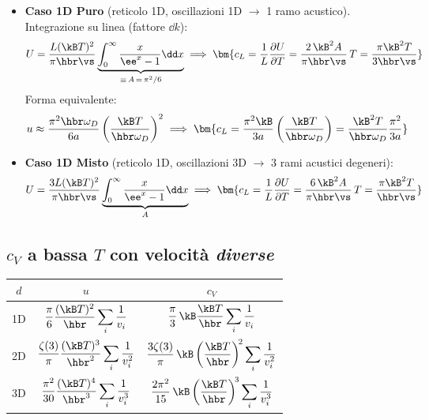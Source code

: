 \begin{itemize}
    \item \textbf{Caso 1D Puro} (reticolo 1D, oscillazioni 1D $\to$ 1 ramo acustico). Integrazione su linea (fattore $\dd k$):
    \[ U = \frac{L (\kB T)^2}{\pi \hbr \vs}\underbrace{\int_0^\infty \frac{x}{\ee^x - 1}\dd x}_{\equiv\,A\,=\,\pi^2/6}
       \implies \bm{c_L = \frac{1}{L}\frac{\partial U}{\partial T} = \frac{2\,\kB^2 A}{\pi \hbr \vs}\,T
                  = \frac{\pi \kB^2 T}{3\hbr \vs}} \]
    Forma equivalente:
    \[ u \approx \frac{\pi^2\hbr\omega_D}{6a}\left(\frac{\kB T}{\hbr\omega_D}\right)^2
       \implies \bm{c_L = \frac{\pi^2 \kB}{3a}\left(\frac{\kB T}{\hbr\omega_D}\right)
                   = \frac{\kB^2 T}{\hbr\omega_D}\frac{\pi^2}{3a}} \]

    \item \textbf{Caso 1D Misto} (reticolo 1D, oscillazioni 3D $\to$ 3 rami acustici degeneri):
    \[ U = \frac{3 L (\kB T)^2}{\pi \hbr \vs}\underbrace{\int_0^\infty \frac{x}{\ee^x - 1}\dd x}_{A}
       \implies \bm{c_L = \frac{1}{L}\frac{\partial U}{\partial T} = \frac{6\,\kB^2 A}{\pi \hbr \vs}\,T = \frac{\pi\kB^2 T}{\hbr \vs}} \]
\end{itemize}


\subsection{$c_V$ a bassa $T$ con velocità \emph{diverse}}
\begin{center}
\renewcommand{\arraystretch}{2.0}
\begin{tabular}{c c c}
\toprule
$d$ & $u$  & $c_V$ \\
\midrule
1D & $\dfrac{\pi}{6}\dfrac{(\kB T)^2}{\hbr}\displaystyle\sum_i\frac{1}{v_i}$ &
     $\dfrac{\pi}{3}\,\kB\dfrac{\kB T}{\hbr}\displaystyle\sum_i\frac{1}{v_i}$ \\
2D & $\dfrac{\zeta(3)}{\pi}\dfrac{(\kB T)^3}{\hbr^2}\displaystyle\sum_i\frac{1}{v_i^2}$ &
     $\dfrac{3\zeta(3)}{\pi}\,\kB\left(\dfrac{\kB T}{\hbr}\right)^{\!2}\displaystyle\sum_i\frac{1}{v_i^2}$ \\
3D & $\dfrac{\pi^2}{30}\dfrac{(\kB T)^4}{\hbr^3}\displaystyle\sum_i\frac{1}{v_i^3}$ &
     $\dfrac{2\pi^2}{15}\,\kB\left(\dfrac{\kB T}{\hbr}\right)^{\!3}\displaystyle\sum_i\frac{1}{v_i^3}$ \\
\bottomrule
\end{tabular}
\end{center}


